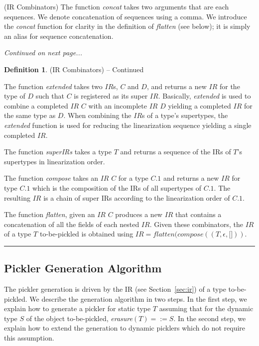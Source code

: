 \documentclass[preprint,10pt]{sigplanconf}
\theoremstyle{definition}
\theoremstyle{definition}
\newtheorem*{defn*}{Definition}
\begin{document}
\begin{defn}{(IR Combinators)}
The function \textit{concat} takes two arguments that are each sequences. We
denote concatenation of sequences using a comma. We introduce the
\textit{concat} function for clarity in the definition of \textit{flatten}
(see below); it is simply an alias for sequence concatenation.

\vspace{0.4cm}

\textit{Continued on next page...}

\vspace{0.6cm}

\end{defn}


\begin{defn*}{(IR Combinators) -- Continued}

The function \textit{extended} takes two $IR$s, $C$ and $D$, and returns a new
$IR$ for the type of $D$ such that $C$ is registered as its super $IR$.
Basically, \textit{extended} is used to combine a completed $IR$ $C$ with an
incomplete $IR$ $D$ yielding a completed $IR$ for the same type as $D$. When
combining the $IR$s of a type's supertypes, the \textit{extended} function is
used for reducing the linearization sequence yielding a single completed $IR$.

The function \textit{superIRs} takes a type $T$ and returns a sequence of the
IRs of $T$'s supertypes in linearization order.

The function \textit{compose} takes an $IR$ $C$ for a type $C.1$ and returns a
new $IR$ for type $C.1$ which is the composition of the IRs of all supertypes
of $C.1$. The resulting $IR$ is a chain of super IRs according to the
linearization order of $C.1$.

The function \textit{flatten}, given an $IR$ $C$ produces a new $IR$ that
contains a concatenation of all the fields of each nested $IR$. Given
these combinators, the $IR$ of a type $T$ to-be-pickled is obtained
using $IR = flatten(compose((T, \epsilon, \lbrack \rbrack))$.
\end{defn*}

\rule{0.9\columnwidth}{0.7pt}

\subsection{Pickler Generation Algorithm}

The pickler generation is driven by the IR (see Section~\ref{sec:ir}) of a
type to-be-pickled. We describe the generation algorithm in two steps. In the
first step, we explain how to generate a pickler for static type $T$ assuming
that for the dynamic type $S$ of the object to-be-pickled,
\textit{erasure}$(T) =:= S$. In the second step, we explain how to extend the
generation to dynamic picklers which do not require this assumption.
\end{document}
